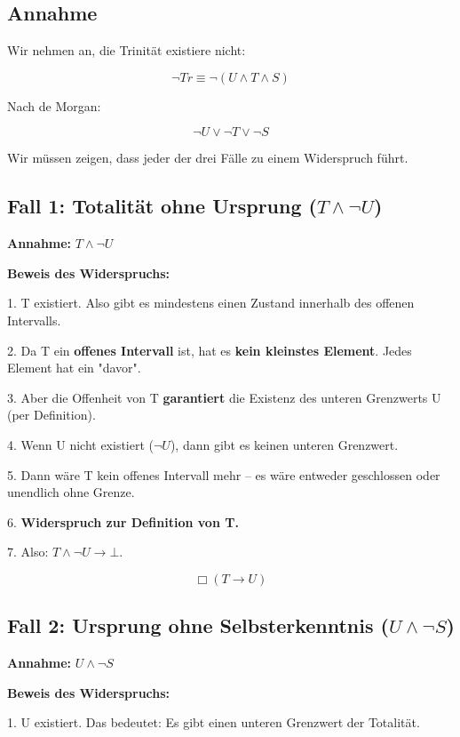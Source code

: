\documentclass[
]{article}
\begin{document}
\subsection{Annahme}\label{annahme}

Wir nehmen an, die Trinität existiere nicht:

\[
\neg Tr \equiv \neg(U \land T \land S)
\]

Nach de Morgan:

\[
\neg U \lor \neg T \lor \neg S
\]

Wir müssen zeigen, dass jeder der drei Fälle zu einem Widerspruch führt.

\subsection{Fall 1: Totalität ohne Ursprung (\(T \land \neg U\))}\label{fall-1-totalituxe4t-ohne-ursprung-t-land-neg-u}

\textbf{Annahme:} \(T \land \neg U\)

\textbf{Beweis des Widerspruchs:}

1. T existiert. Also gibt es mindestens einen Zustand innerhalb des offenen Intervalls.

2. Da T ein \textbf{offenes Intervall} ist, hat es \textbf{kein kleinstes Element}. Jedes Element hat ein "davor".

3. Aber die Offenheit von T \textbf{garantiert} die Existenz des unteren Grenzwerts U (per Definition).

4. Wenn U nicht existiert (\(\neg U\)), dann gibt es keinen unteren Grenzwert.

5. Dann wäre T kein offenes Intervall mehr – es wäre entweder geschlossen oder unendlich ohne Grenze.

6. \textbf{Widerspruch zur Definition von T.}

7. Also: \(T \land \neg U \rightarrow \bot\).

\[
\boxed{\Box(T \rightarrow U)}
\]

\subsection{Fall 2: Ursprung ohne Selbsterkenntnis (\(U \land \neg S\))}\label{fall-2-ursprung-ohne-selbsterkenntnis-u-land-neg-s}

\textbf{Annahme:} \(U \land \neg S\)

\textbf{Beweis des Widerspruchs:}

1. U existiert. Das bedeutet: Es gibt einen unteren Grenzwert der Totalität.
\end{document}
